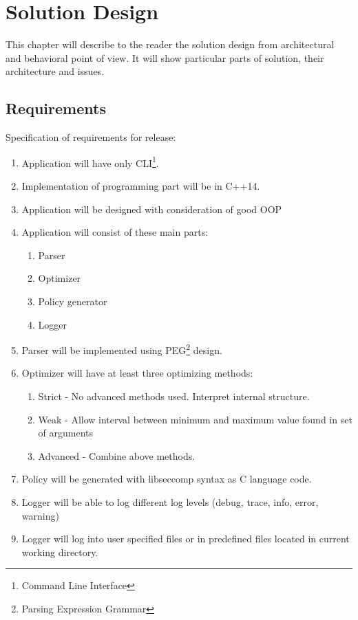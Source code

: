 \chapter{Solution Design}
\label{chap:design}
This chapter will describe to the reader the solution design from architectural and behavioral point of view.
It will show particular parts of solution, their architecture and issues.

\section{Requirements}
\label{sec:requirements}
Specification of requirements for release:
\begin{enumerate}
\item Application will have only CLI\footnote{Command Line Interface}.
\item Implementation of programming part will be in C++14\cite{ISO14882}.
\item Application will be designed with consideration of good OOP
\item Application will consist of these main parts:
	\begin{enumerate}
    \item Parser
    \item Optimizer
    \item Policy generator
    \item Logger
	\end{enumerate}
\item Parser will be implemented using PEG\footnote{Parsing Expression Grammar}\cite{PEG_def} design.
\item Optimizer will have at least three optimizing methods:
	\begin{enumerate}
    \item Strict - No advanced methods used. Interpret internal structure.
    \item Weak - Allow interval between minimum and maximum value found in set of arguments
    \item Advanced - Combine above methods.
	\end{enumerate}
\item Policy will be generated with libseccomp\cite{libseccomp_git} syntax as C language\cite{ISO9899} code.
\item Logger will be able to log different log levels (debug, trace, info, error, warning)
\item Logger will log into user specified files or in predefined files located in current working directory.
\end{enumerate}

